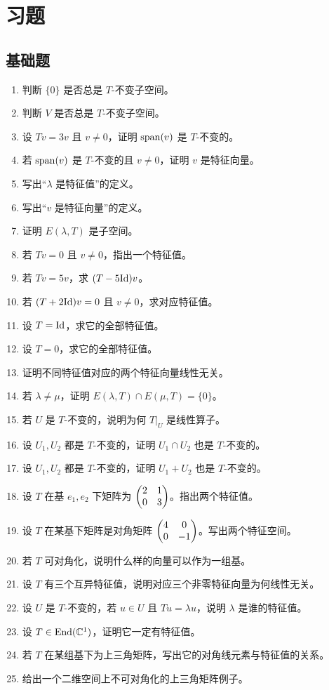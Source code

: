 \section*{习题}

\subsection*{基础题}
\begin{enumerate}[label=\textbf{\arabic*.}, leftmargin=*, itemsep=0.5em]
\item \basic 判断 $\{0\}$ 是否总是 $T$-不变子空间。
\item \basic 判断 $V$ 是否总是 $T$-不变子空间。
\item \basic 设 $Tv=3v$ 且 $v\neq 0$，证明 $\operatorname{span}(v)$ 是 $T$-不变的。
\item \basic 若 $\operatorname{span}(v)$ 是 $T$-不变的且 $v\neq 0$，证明 $v$ 是特征向量。
\item \basic 写出“$\lambda$ 是特征值”的定义。
\item \basic 写出“$v$ 是特征向量”的定义。
\item \basic 证明 $E(\lambda,T)$ 是子空间。
\item \basic 若 $Tv=0$ 且 $v\neq 0$，指出一个特征值。
\item \basic 若 $Tv=5v$，求 $(T-5\mathrm{Id})v$。
\item \basic 若 $(T+2\mathrm{Id})v=0$ 且 $v\neq 0$，求对应特征值。
\item \basic 设 $T=\mathrm{Id}$，求它的全部特征值。
\item \basic 设 $T=0$，求它的全部特征值。
\item \basic 证明不同特征值对应的两个特征向量线性无关。
\item \basic 若 $\lambda\neq\mu$，证明 $E(\lambda,T)\cap E(\mu,T)=\{0\}$。
\item \basic 若 $U$ 是 $T$-不变的，说明为何 $T|_U$ 是线性算子。
\item \basic 设 $U_1,U_2$ 都是 $T$-不变的，证明 $U_1\cap U_2$ 也是 $T$-不变的。
\item \basic 设 $U_1,U_2$ 都是 $T$-不变的，证明 $U_1+U_2$ 也是 $T$-不变的。
\item \basic 设 $T$ 在基 $e_1,e_2$ 下矩阵为 $\begin{pmatrix} 2&1\\0&3 \end{pmatrix}$。指出两个特征值。
\item \basic 设 $T$ 在某基下矩阵是对角矩阵 $\begin{pmatrix} 4&0\\0&-1 \end{pmatrix}$。写出两个特征空间。
\item \basic 若 $T$ 可对角化，说明什么样的向量可以作为一组基。
\item \basic 设 $T$ 有三个互异特征值，说明对应三个非零特征向量为何线性无关。
\item \basic 设 $U$ 是 $T$-不变的，若 $u\in U$ 且 $Tu=\lambda u$，说明 $\lambda$ 是谁的特征值。
\item \basic 设 $T\in\mathrm{End}(\mathbb{C}^1)$，证明它一定有特征值。
\item \basic 若 $T$ 在某组基下为上三角矩阵，写出它的对角线元素与特征值的关系。
\item \basic 给出一个二维空间上不可对角化的上三角矩阵例子。
\end{enumerate}


